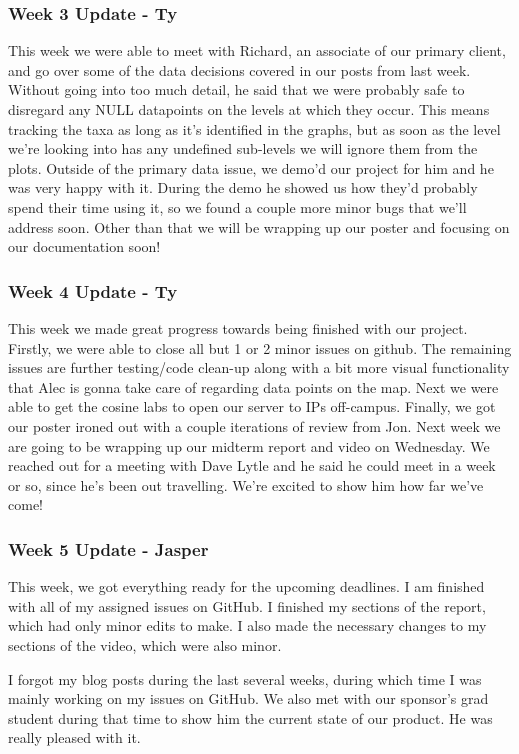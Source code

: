 \subsubsection{Week 3 Update - Ty}
This week we were able to meet with Richard, an associate of our primary client, and go over some of the data decisions covered in our posts from last week.
Without going into too much detail, he said that we were probably safe to disregard any NULL datapoints on the levels at which they occur.
This means tracking the taxa as long as it's identified in the graphs, but as soon as the level we're looking into has any undefined sub-levels we will ignore them from the plots.
Outside of the primary data issue, we demo'd our project for him and he was very happy with it.
During the demo he showed us how  they'd probably spend their time using it, so we found a couple more minor bugs that we'll address soon.
Other than that we will be wrapping up our poster and focusing on our documentation soon!

\subsubsection{Week 4 Update - Ty}
This week we made great progress towards being finished with our project.
Firstly, we were able to close all but 1 or 2 minor issues on github​.
The remaining issues are further testing/code clean-up along with a bit more visual functionality that Alec is gonna take care of regarding data points on the map.
Next we were able to get the cosine labs to open our server to IPs off-campus.
Finally, we got our poster ironed out with a couple iterations of review from Jon.
Next week we are going to be wrapping up our midterm report and video on Wednesday.
We reached out for a meeting with Dave Lytle and he said he could meet in a week or so, since he's been out travelling.
We're excited to show him how far we've come!

\subsubsection{Week 5 Update - Jasper}
This week, we got everything ready for the upcoming deadlines.
I am finished with all of my assigned issues on GitHub.
I finished my sections of the report, which had only minor edits to make.
I also made the necessary changes to my sections of the video, which were also minor.

I forgot my blog posts during the last several weeks, during which time I was mainly working on my issues on GitHub.
We also met with our sponsor's grad student during that time to show him the current state of our product.
He was really pleased with it.

